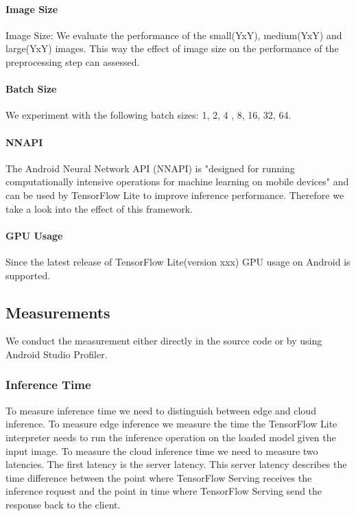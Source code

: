 \paragraph{Image Size}
Image Size: We evaluate the performance of the small(YxY), medium(YxY) and large(YxY) images. This way the effect of image size on the performance of the preprocessing step can assessed.
\paragraph{Batch Size}
We experiment with the following batch sizes: 1, 2, 4 , 8, 16, 32, 64.
\paragraph{NNAPI}
The Android Neural Network API (NNAPI)
is "designed for running computationally intensive operations for machine learning on mobile devices" \cite{NNAPI} and can be used by TensorFlow Lite to improve inference performance. Therefore we take a look into the effect of this framework.
\paragraph{GPU Usage}
Since the latest release of TensorFlow Lite(version xxx) GPU usage on Android is supported. 

\subsection{Measurements}
We conduct the measurement either directly in the source code or by using Android Studio Profiler.
\subsubsection{Inference Time}
To measure inference time we need to  distinguish between edge and cloud inference. To measure edge inference we measure the time the TensorFlow Lite interpreter needs to run the inference operation on the loaded model given the input image.
To measure the cloud inference time we need to measure two latencies. The first latency is the server latency. This server latency describes the time difference between the point where TensorFlow Serving receives the inference request and the point in time where TensorFlow Serving send the response back to the client.



